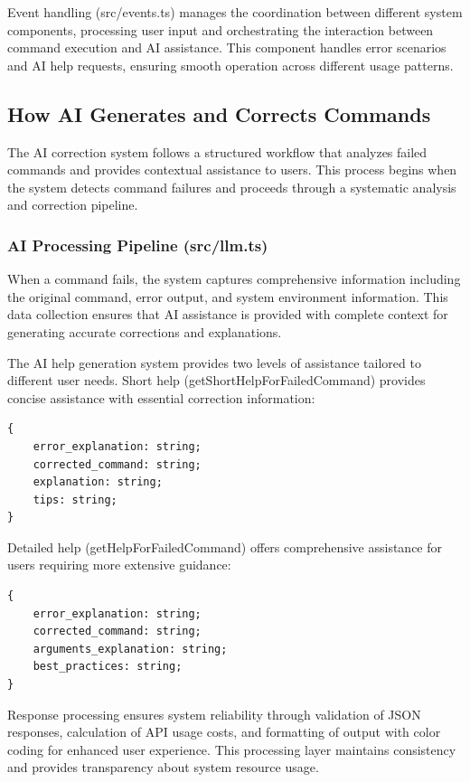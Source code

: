 Event handling (src/events.ts) manages the coordination between different system components, processing user input and orchestrating the interaction between command execution and AI assistance. This component handles error scenarios and AI help requests, ensuring smooth operation across different usage patterns.

\subsection{How AI Generates and Corrects Commands}

The AI correction system follows a structured workflow that analyzes failed commands and provides contextual assistance to users. This process begins when the system detects command failures and proceeds through a systematic analysis and correction pipeline.

\subsubsection{AI Processing Pipeline (src/llm.ts)}

When a command fails, the system captures comprehensive information including the original command, error output, and system environment information. This data collection ensures that AI assistance is provided with complete context for generating accurate corrections and explanations.

The AI help generation system provides two levels of assistance tailored to different user needs. Short help (getShortHelpForFailedCommand) provides concise assistance with essential correction information:

\begin{verbatim}
{
    error_explanation: string;
    corrected_command: string;
    explanation: string;
    tips: string;
}
\end{verbatim}

Detailed help (getHelpForFailedCommand) offers comprehensive assistance for users requiring more extensive guidance:

\begin{verbatim}
{
    error_explanation: string;
    corrected_command: string;
    arguments_explanation: string;
    best_practices: string;
}
\end{verbatim}

Response processing ensures system reliability through validation of JSON responses, calculation of API usage costs, and formatting of output with color coding for enhanced user experience. This processing layer maintains consistency and provides transparency about system resource usage.

